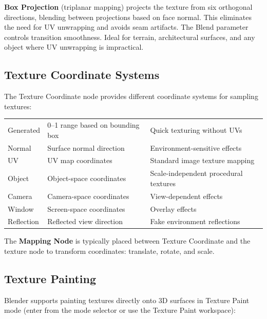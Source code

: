 \textbf{Box Projection} (triplanar mapping) projects the texture
from six orthogonal directions, blending between projections based
on face normal. This eliminates the need for UV unwrapping and
avoids seam artifacts. The Blend parameter controls transition
smoothness. Ideal for terrain, architectural surfaces, and any
object where UV unwrapping is impractical.

\subsection{Texture Coordinate Systems}

The Texture Coordinate node provides different coordinate systems
for sampling textures:

\begin{center}
\begin{tabularx}{\textwidth}{L{2.5cm}L{5cm}X}
\toprule
{}
 &  &  \\
\midrule
Generated & 0--1 range based on bounding box & Quick texturing without UVs \\
Normal & Surface normal direction & Environment-sensitive effects \\
UV & UV map coordinates & Standard image texture mapping \\
Object & Object-space coordinates & Scale-independent procedural textures \\
Camera & Camera-space coordinates & View-dependent effects \\
Window & Screen-space coordinates & Overlay effects \\
Reflection & Reflected view direction & Fake environment reflections \\
\bottomrule
\end{tabularx}
\end{center}

The \textbf{Mapping Node} is typically placed between Texture
Coordinate and the texture node to transform coordinates: translate,
rotate, and scale.

\subsection{Texture Painting}

Blender supports painting textures directly onto 3D surfaces in
Texture Paint mode (enter from the mode selector or use the Texture
Paint workspace):

